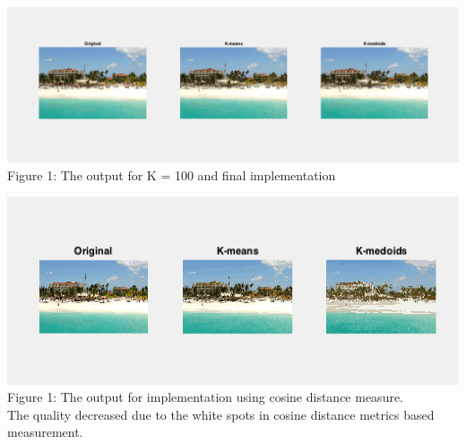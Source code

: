 \documentclass[twoside,10pt]{article}
\begin{document}
\begin{enumerate}
 \includegraphics[width=\textwidth,height=\textheight,keepaspectratio]{final_implementation.png}
 Figure 1: The output for K = 100 and final implementation
 
 \includegraphics[width=\textwidth,height=\textheight,keepaspectratio]{cosine_distance_implementation.png}
 Figure 1: The output for implementation using cosine distance measure. \\
 The quality decreased due to the white spots in cosine distance metrics based measurement. 
 
\vspace{1cm}
  

\end{enumerate}
\end{document}
